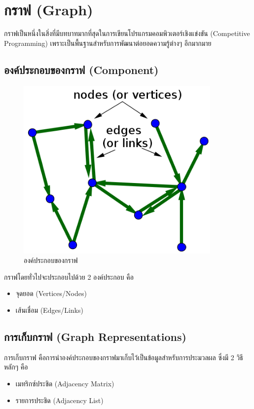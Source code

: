 \chapter{กราฟ (Graph)}

กราฟเป็นหนึ่งในสิ่งที่มีบทบาทมากที่สุดในการเขียนโปรแกรมคอมพิวเตอร์เชิงแข่งขัน (Competitive Programming) เพราะเป็นพื้นฐานสำหรับการพัฒนาต่อยอดความรู้ต่างๆ อีกมากมาย

\section{องค์ประกอบของกราฟ (Component)}

\begin{figure}[h!]
	\centering
    \includegraphics[width=10cm]{images/graph-component}
    \caption{องค์ประกอบของกราฟ}
    \label{fig:graph_component}
\end{figure}


กราฟโดยทั่วไปจะประกอบไปด้วย 2 องค์ประกอบ คือ
\begin{itemize}
\item จุดยอด (Vertices/Nodes)
\item เส้นเชื่อม (Edges/Links)
\end{itemize}

\section{การเก็บกราฟ (Graph Representations)}

การเก็บกราฟ คือการนำองค์ประกอบของกราฟมาเก็บไว้เป็นข้อมูลสำหรับการประมวลผล ซึ่งมี 2 วิธีหลักๆ คือ
\begin{itemize}
\item เมทริกซ์ประชิด (Adjacency Matrix)
\item รายการประชิด (Adjacency List)
\end{itemize}

